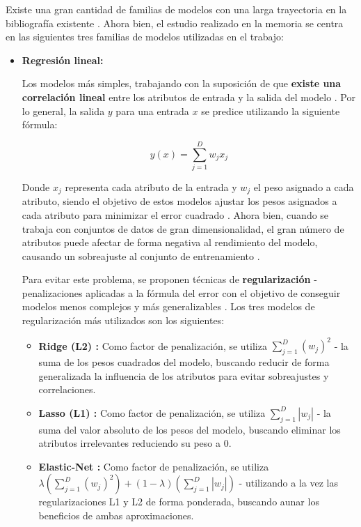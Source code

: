 Existe una gran cantidad de familias de modelos con una larga trayectoria en la bibliografía existente \cite{Burkov2019TheHM}. Ahora bien, el estudio realizado en la memoria se centra en las siguientes tres familias de modelos utilizadas en el trabajo:

\begin{itemize}[leftmargin=*]
	\item \textbf{Regresión lineal:} 
	
	Los modelos más simples, trabajando con la suposición de que \textbf{existe una correlación lineal} entre los atributos de entrada y la salida del modelo \cite{mlprobabilistic}. Por lo general, la salida $y$ para una entrada $x$ se predice utilizando la siguiente fórmula: 

	$$y(x) = \sum_{j=1}^{D}w_j x_j$$
	
	Donde $x_j$ representa cada atributo de la entrada y $w_j$ el peso asignado a cada atributo, siendo el objetivo de estos modelos ajustar los pesos asignados a cada atributo para minimizar el error cuadrado \cite{aima}. Ahora bien, cuando se trabaja con conjuntos de datos de gran dimensionalidad, el gran número de atributos puede afectar de forma negativa al rendimiento del modelo, causando un sobreajuste al conjunto de entrenamiento \cite{l1l2}.
	
	Para evitar este problema, se proponen técnicas de \textbf{regularización} - penalizaciones aplicadas a la fórmula del error con el objetivo de conseguir modelos menos complejos y más generalizables \cite{elasticnet}. Los tres modelos de regularización más utilizados son los siguientes:
	
	\begin{itemize}
		\item \textbf{Ridge (L2) \cite{ridge}:} Como factor de penalización, se utiliza $\sum_{j=1}^D(w_j)^2$ - la suma de los pesos cuadrados del modelo, buscando reducir de forma generalizada la influencia de los atributos para evitar sobreajustes y correlaciones.
		\item \textbf{Lasso (L1) \cite{lasso}:} Como factor de penalización, se utiliza $\sum_{j=1}^D|w_j|$ - la suma del valor absoluto de los pesos del modelo, buscando eliminar los atributos irrelevantes reduciendo su peso a $0$.
		\item \textbf{Elastic-Net \cite{elasticnet}:} Como factor de penalización, se utiliza $\lambda\left(\sum_{j=1}^D(w_j)^2\right) + (1-\lambda)\left(\sum_{j=1}^D|w_j|\right)$ - utilizando a la vez las regularizaciones L1 y L2 de forma ponderada, buscando aunar los beneficios de ambas aproximaciones.
	\end{itemize}


\end{itemize}
